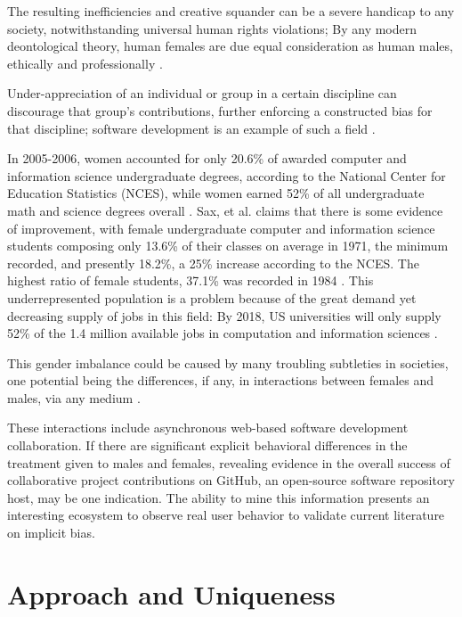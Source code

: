 \documentclass{sigplanconf}
\begin{document}
The resulting inefficiencies and creative
squander can be a severe handicap to any society, notwithstanding universal human rights
violations; By any modern deontological theory, human females are due equal
consideration as human males, ethically and professionally \citep{ethicsgender}.

Under-appreciation of an individual or group in a certain
discipline can discourage that group's contributions, further enforcing a
constructed bias for that discipline; software development is an example of such
a field \citep{genderscience}.

In 2005-2006, women accounted for only 20.6\% of awarded computer and information
science undergraduate degrees, according to the National Center for Education
Statistics (NCES), while women earned 52\% of all undergraduate
math and science degrees overall \citep{genderdiversitycomputing}.
Sax, et al. claims that there is some evidence of improvement, with female
undergraduate computer and information science students composing only 13.6\% of
their classes on average in 1971, the minimum recorded, and presently 18.2\%, a
25\% increase according to the NCES. The highest ratio of female students,
37.1\% was recorded in 1984 \citep{evolutionofwomen}.
This underrepresented population is a problem because of the great demand yet
decreasing supply of jobs in this field: By 2018, US universities will only
supply 52\% of the 1.4 million available jobs in computation and information
sciences \citep{genderdiversitycomputing}.

This gender imbalance could be caused by many troubling subtleties
in societies, one potential being the differences, if any, in interactions
between females and males, via any medium \citep{implicitbias}.

These interactions include asynchronous web-based software development
collaboration. If there are significant explicit behavioral differences in the
treatment given to males and females, revealing evidence in the overall success of
collaborative project contributions on GitHub, an open-source software
repository host, may be one indication. The ability to mine this information
presents an interesting ecosystem to observe real user behavior to validate current
literature on implicit bias.

\section{Approach and Uniqueness}
\end{document}
